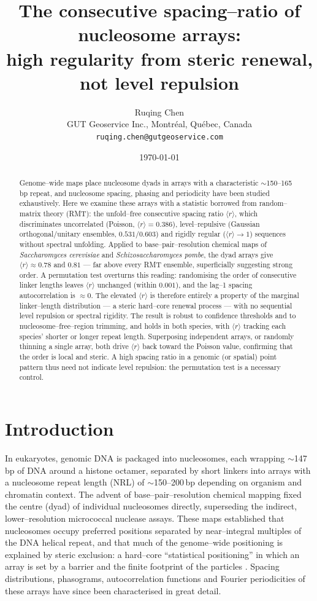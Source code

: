 \documentclass[11pt]{article}
\title{\bfseries The consecutive spacing--ratio of nucleosome arrays:\\
high regularity from steric renewal, not level repulsion}
\author{Ruqing Chen\\[2pt]
\small GUT Geoservice Inc., Montr\'eal, Qu\'ebec, Canada\\
\small \texttt{ruqing.chen@gutgeoservice.com}}
\date{\today}
\renewcommand{\r}{\langle r\rangle}
\begin{document}
\maketitle

\begin{abstract}
\noindent
Genome--wide maps place nucleosome dyads in arrays with a characteristic
$\sim$150--165\,bp repeat, and nucleosome spacing, phasing and periodicity have
been studied exhaustively. Here we examine these arrays with a statistic
borrowed from random--matrix theory (RMT): the unfold--free consecutive
spacing ratio $\r$, which discriminates uncorrelated (Poisson, $\r=0.386$),
level--repulsive (Gaussian orthogonal/unitary ensembles, $0.531/0.603$) and
rigidly regular ($\r\!\to\!1$) sequences without spectral unfolding. Applied to
base--pair--resolution chemical maps of \textit{Saccharomyces cerevisiae} and
\textit{Schizosaccharomyces pombe}, the dyad arrays give $\r\approx0.78$ and
$0.81$ --- far above every RMT ensemble, superficially suggesting strong order.
A permutation test overturns this reading: randomising the order of consecutive
linker lengths leaves $\r$ unchanged (within $0.001$), and the lag--1 spacing
autocorrelation is $\approx0$. The elevated $\r$ is therefore entirely a
property of the marginal linker--length distribution --- a steric hard--core
renewal process --- with no sequential level repulsion or spectral rigidity.
The result is robust to confidence thresholds and to nucleosome--free--region
trimming, and holds in both species, with $\r$ tracking each species' shorter or
longer repeat length. Superposing independent arrays, or randomly thinning a
single array, both drive $\r$ back toward the Poisson value, confirming that the
order is local and steric. A high spacing ratio in a genomic (or spatial) point
pattern thus need not indicate level repulsion: the permutation test is a
necessary control.
\end{abstract}

\section{Introduction}

In eukaryotes, genomic DNA is packaged into nucleosomes, each wrapping
$\sim$147\,bp of DNA around a histone octamer, separated by short linkers into
arrays with a nucleosome repeat length (NRL) of $\sim$150--200\,bp depending on
organism and chromatin context. The advent of base--pair--resolution chemical
mapping \citep{brogaard2012,moyle2013} fixed the centre (dyad) of individual
nucleosomes directly, superseding the indirect, lower--resolution micrococcal
nuclease assays. These maps established that nucleosomes occupy preferred
positions separated by near--integral multiples of the DNA helical repeat, and
that much of the genome--wide positioning is explained by steric exclusion: a
hard--core ``statistical positioning'' in which an array is set by a barrier and
the finite footprint of the particles \citep{kornberg1988,chereji2018}. Spacing
distributions, phasograms, autocorrelation functions and Fourier periodicities
of these arrays have since been characterised in great detail.
\end{document}

